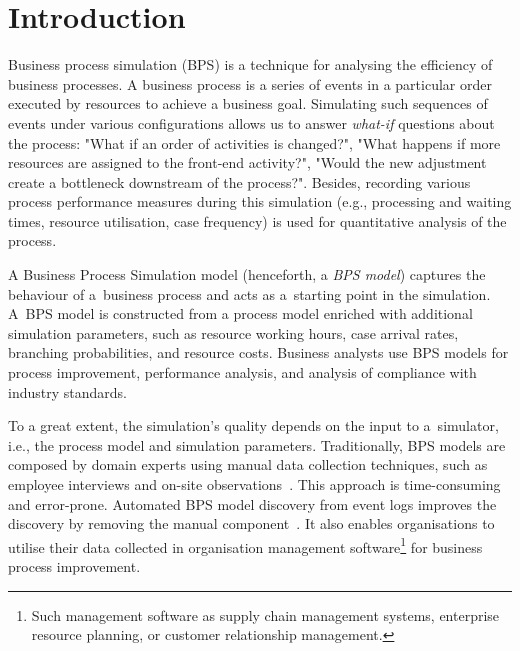 \documentclass[12pt]{article}
\begin{document}

\newpage
\tableofcontents

\newpage
\listoffigures

\newpage
\listoftables

\newpage
\section*{Introduction}

Business process simulation (BPS) is a technique for analysing the efficiency of business processes. 
A business process is a series of events in a particular order executed by resources to achieve a business goal. 
Simulating such sequences of events under various configurations allows us to answer \emph{what-if} questions about the process: "What if an order of activities is changed?", "What happens if more resources are assigned to the front-end activity?", "Would the new adjustment create a bottleneck downstream of the process?". 
Besides, recording various process performance measures during this simulation (e.g., processing and waiting times, resource utilisation, case frequency) is used for quantitative analysis of the process.

A Business Process Simulation model (henceforth, a \textit{BPS model}) captures the behaviour of a~business process and acts as a~starting point in the simulation. 
A~BPS model is constructed from a process model enriched with additional simulation parameters, such as resource working hours, case arrival rates, branching probabilities, and resource costs. 
Business analysts use BPS models for process improvement, performance analysis, and analysis of compliance with industry standards.

To a great extent, the simulation's quality depends on the input to a~simulator, i.e., the process model and simulation parameters. 
Traditionally, BPS models are composed by domain experts using manual data collection techniques, such as employee interviews and on-site observations~\cite{camargo_automated_2020}. 
This approach is time-consuming and error-prone. 
Automated BPS model discovery from event logs improves the discovery by removing the manual component~\cite{camargo_automated_2020}.
It also enables organisations to utilise their data collected in organisation management software\footnote{Such management software as supply chain management systems, enterprise resource planning, or customer relationship management.} for business process improvement. 
\end{document}
